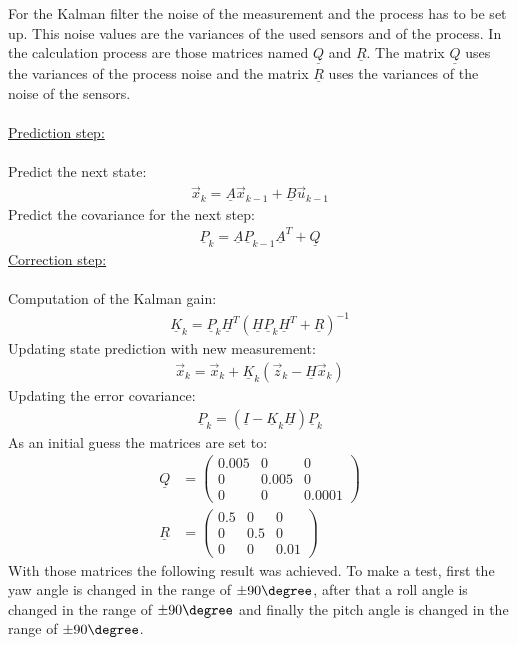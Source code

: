 For the Kalman filter the noise of the measurement and the process has to be set up. This noise values are the variances of the used sensors and of the process. In the calculation process are those matrices named $\underline Q$ and $\underline R$. The matrix $\underline Q$ uses the variances of the process noise and the matrix $\underline R$ uses the variances of the noise of the sensors.\\\\
\underline{Prediction step:}\\\\
Predict the next state:
\begin{align}
\vec x_k = \underline{A}\vec x_{k-1}+\underline{B}\vec u_{k-1}
\label{equ:KalmanFilterResult:Kalman1}
\end{align}
Predict the covariance for the next step:
\begin{align}
\underline{P}_k = \underline{A}\underline{P}_{k-1}\underline{A}^T+\underline{Q}
\label{equ:KalmanFilterResult:Kalman2}
\end{align}
\underline{Correction step:}\\\\
Computation of the Kalman gain:
\begin{align}
\underline{K}_k = \underline{P}_k	\underline{H}^T(\underline{H}\underline{P}_k\underline{H}^T+\underline{R})^{-1}
\label{equ:KalmanFilterResult:Kalman3}
\end{align}
Updating state prediction with new measurement:
\begin{align}
\vec x_k = 	\vec x_k+\underline{K}_k(\vec z_k-\underline{H}\vec x_k)
\label{equ:KalmanFilterResult:Kalman4}
\end{align}
Updating the error covariance:
\begin{align}
\underline{P}_k = (\underline{I}-\underline{K}_k\underline{H})\underline{P}_k	
\label{equ:KalmanFilterResult:Kalman5}
\end{align}
As an initial guess the matrices are set to:
\begin{align}
\underline{Q} &= \begin{pmatrix} 0.005&0&0 \\ 0&0.005&0 \\ 0&0&0.0001 \end{pmatrix}\\
\underline{R} &= \begin{pmatrix} 0.5&0&0 \\ 0&0.5&0 \\ 0&0&0.01 \end{pmatrix}
\end{align}
With those matrices the following result was achieved. To make a test, first the yaw angle is changed in the range of $\pm90 \degree$, after that a roll angle is changed in the range of $\pm90 \degree$ and finally the pitch angle is changed in the range of $\pm90 \degree$. 

